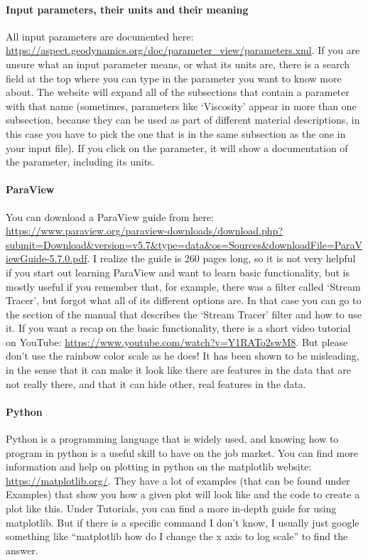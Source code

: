 \documentclass[notitlepage]{article}
\begin{document}
\paragraph{Input parameters, their units and their meaning}
All input parameters are documented here: \url{https://aspect.geodynamics.org/doc/parameter_view/parameters.xml}. 
If you are unsure what an input parameter means, or what its units are, there is a search field at the top where you can type in the parameter you want to know more about. The website will expand all of the subsections that contain a parameter with that name (sometimes, parameters like `Viscosity' appear in more than one subsection, because they can be used as part of different material descriptions, in this case you have to pick the one that is in the same subsection as the one in your input file). If you click on the parameter, it will show a documentation of the parameter, including its units. 

\paragraph{ParaView}
You can download a ParaView guide from here: \url{https://www.paraview.org/paraview-downloads/download.php?submit=Download&version=v5.7&type=data&os=Sources&downloadFile=ParaViewGuide-5.7.0.pdf}. I realize the guide is 260 pages long, so it is not very helpful if you start out learning ParaView and want to learn basic functionality, but is mostly useful if you remember that, for example, there was a filter called `Stream Tracer', but forgot what all of its different options are. In that case you can go to the section of the manual that describes the `Stream Tracer' filter and how to use it. 
If you want a recap on the basic functionality, there is a short video tutorial on YouTube: \url{https://www.youtube.com/watch?v=Y1RATo2swM8}. But please don't use the rainbow color scale as he does! It has been shown to be misleading, in the sense that it can make it look like there are features in the data that are not really there, and that it can hide other, real features in the data. 

\paragraph{Python}
Python is a programming language that is widely used, and knowing how to program in python is a useful skill to have on the job market. 
You can find more information and help on plotting in python on the matplotlib website: \url{https://matplotlib.org/}. They have a lot of examples (that can be found under Examples) that show you how a given plot will look like and the code to create a plot like this. Under Tutorials, you can find a more in-depth guide for using matplotlib.
But if there is a specific command I don't know, I usually just google something like ``matplotlib how do I change the x axis to log scale'' to find the answer. 
\end{document}
